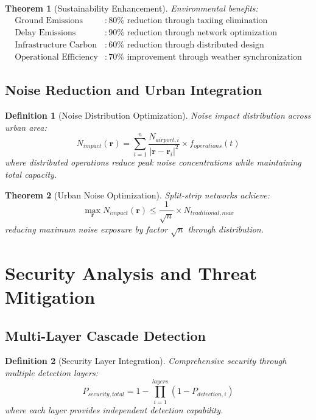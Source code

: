 \documentclass[12pt,a4paper]{article}
\newtheorem{theorem}{Theorem}
\newtheorem{definition}{Definition}
\begin{document}
\begin{theorem}[Sustainability Enhancement]
Environmental benefits:
\begin{align}
\text{Ground Emissions} &: 80\% \text{ reduction through taxiing elimination} \\
\text{Delay Emissions} &: 90\% \text{ reduction through network optimization} \\
\text{Infrastructure Carbon} &: 60\% \text{ reduction through distributed design} \\
\text{Operational Efficiency} &: 70\% \text{ improvement through weather synchronization}
\end{align}
\end{theorem}

\subsection{Noise Reduction and Urban Integration}

\begin{definition}[Noise Distribution Optimization]
Noise impact distribution across urban area:
\begin{equation}
N_{impact}(\mathbf{r}) = \sum_{i=1}^n \frac{N_{airport,i}}{|\mathbf{r} - \mathbf{r}_i|^2} \times f_{operations}(t)
\end{equation}
where distributed operations reduce peak noise concentrations while maintaining total capacity.
\end{definition}

\begin{theorem}[Urban Noise Optimization]
Split-strip networks achieve:
\begin{equation}
\max_{\mathbf{r}} N_{impact}(\mathbf{r}) \leq \frac{1}{\sqrt{n}} \times N_{traditional,max}
\end{equation}
reducing maximum noise exposure by factor $\sqrt{n}$ through distribution.
\end{theorem}

\section{Security Analysis and Threat Mitigation}

\subsection{Multi-Layer Cascade Detection}

\begin{definition}[Security Layer Integration]
Comprehensive security through multiple detection layers:
\begin{equation}
P_{security,total} = 1 - \prod_{i=1}^{layers} (1 - P_{detection,i})
\end{equation}
where each layer provides independent detection capability.
\end{definition}
\end{document}
